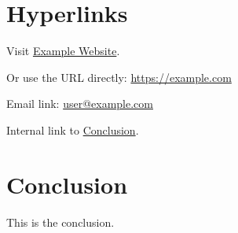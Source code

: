 \documentclass{article}
\begin{document}
\section{Hyperlinks}

Visit \href{https://example.com}{Example Website}.

Or use the URL directly: \url{https://example.com}

Email link: \href{mailto:user@example.com}{user@example.com}

Internal link to \hyperref[sec:conclusion]{Conclusion}.

\section{Conclusion}
\label{sec:conclusion}

This is the conclusion.
\end{document}
